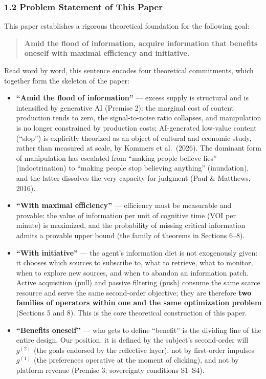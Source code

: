 \documentclass[
  11pt]{article}
\providecommand{\tightlist}{%
  \setlength{\itemsep}{0pt}\setlength{\parskip}{0pt}}
\begin{document}
\subsubsection{1.2 Problem Statement of This
Paper}\label{problem-statement-of-this-paper}

This paper establishes a rigorous theoretical foundation for the
following goal:

\begin{quote}
\textbf{Amid the flood of information, acquire information that benefits
oneself with maximal efficiency and initiative.}
\end{quote}

Read word by word, this sentence encodes four theoretical commitments,
which together form the skeleton of the paper:

\begin{itemize}
\tightlist
\item
  \textbf{``Amid the flood of information''} --- excess supply is
  structural and is intensified by generative AI (Premise 2): the
  marginal cost of content production tends to zero, the signal-to-noise
  ratio collapses, and manipulation is no longer constrained by
  production costs; AI-generated low-value content (``slop'') is
  explicitly theorized as an object of cultural and economic study,
  rather than measured at scale, by Kommers et al.~(2026). The dominant
  form of manipulation has escalated from ``making people believe lies''
  (indoctrination) to ``making people stop believing anything''
  (inundation), and the latter dissolves the very capacity for judgment
  (Paul \& Matthews, 2016).
\item
  \textbf{``With maximal efficiency''} --- efficiency must be measurable
  and provable: the value of information per unit of cognitive time (VOI
  per minute) is maximized, and the probability of missing critical
  information admits a provable upper bound (the family of theorems in
  Sections 6--8).
\item
  \textbf{``With initiative''} --- the agent's information diet is not
  exogenously given: it chooses which sources to subscribe to, what to
  retrieve, what to monitor, when to explore new sources, and when to
  abandon an information patch. Active acquisition (pull) and passive
  filtering (push) consume the same scarce resource and serve the same
  second-order objective; they are therefore \textbf{two families of
  operators within one and the same optimization problem} (Sections 5
  and 8). This is the core theoretical construction of this paper.
\item
  \textbf{``Benefits oneself''} --- who gets to define ``benefit'' is
  the dividing line of the entire design. Our position: it is defined by
  the subject's second-order will \(g^{(2)}\) (the goals endorsed by the
  reflective layer), not by first-order impulses \(g^{(1)}\) (the
  preferences operative at the moment of clicking), and not by platform
  revenue (Premise 3; sovereignty conditions S1--S4).
\end{itemize}
\end{document}
